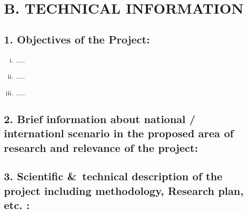 \section*{ B. TECHNICAL INFORMATION}


\subsection*{ 1. Objectives of the Project:}

\begin{enumerate}[i.]
	\item .....
	\item .....
	\item .....
\end{enumerate}

\subsection*{ 2. Brief information about national / internationl
scenario in the proposed area of research and relevance of the project:}



\subsection*{ 3. Scientific \&\ technical description of the project
including methodology, Research plan, etc. :}




